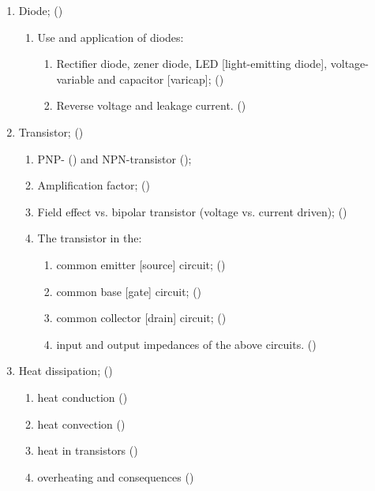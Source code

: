 \begin{flushleft}
\begin{enumerate}
\begin{enumerate}
\item Diode; ()\label{HAREC.a.2.5}
\begin{enumerate}
\item Use and application of diodes:
\begin{enumerate}
\item Rectifier diode, zener diode, LED [light-emitting diode],
  voltage-variable and capacitor [varicap];
  ()\label{HAREC.a.2.5.1.1}
\item Reverse voltage and leakage current.
  ()\label{HAREC.a.2.5.1.2}
\end{enumerate}
\end{enumerate}

\item Transistor; ()\label{HAREC.a.2.6}
\begin{enumerate}
\item PNP- ()\label{HAREC.a.2.6.1a}
  and NPN-transistor ()\label{HAREC.a.2.6.1b};
\item Amplification factor; ()\label{HAREC.a.2.6.2}
\item Field effect vs. bipolar transistor (voltage vs. current driven);
  ()\label{HAREC.a.2.6.3}
\item The transistor in the:
\begin{enumerate}
\item common emitter [source] circuit;
  ()\label{HAREC.a.2.6.4.1}
\item common base [gate] circuit;
  ()\label{HAREC.a.2.6.4.2}
\item common collector [drain] circuit;
  ()\label{HAREC.a.2.6.4.3}
\item input and output impedances of the above circuits.
  ()\label{HAREC.a.2.6.4.4}
\end{enumerate}
\end{enumerate}

\item Heat dissipation; ()\label{HAREC.a.2.7}
\begin{enumerate}
\item heat conduction ()\label{HAREC.a.2.7.1}
\item heat convection ()\label{HAREC.a.2.7.2}
\item heat in transistors ()\label{HAREC.a.2.7.3}
\item overheating and consequences ()\label{HAREC.a.2.7.4}
\end{enumerate}


\end{enumerate}
\end{enumerate}
\end{flushleft}
